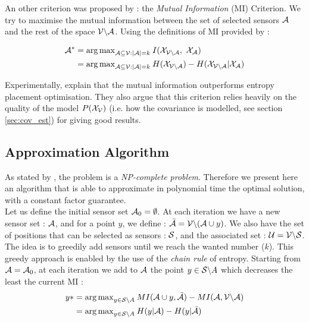 An other criterion was proposed by \citet{caselton_optimal_1984} : the \textit{Mutual Information} (MI) Criterion. We try to maximise the mutual information between the set of selected sensors $\A$ and the rest of the space $\VA$. Using the definitions of MI provided by \citet[p.~19]{cover_elements_1991} : 

\begin{align}
    \A^* &= {\arg\max}_{\A \subseteq \V : |\A| = k } \: I(\X_{\VA} , \X_\A) \\
    &= {\arg\max}_{\A \subseteq \V : |\A| = k } \: H(\X_{\VA}) -  H(\X_{\VA} | \X_{\A})
\end{align}


Experimentally, \citet{krause_near-optimal_2008} explain that  the mutual information outperforms entropy placement optimisation. They also argue that this criterion relies heavily on the quality of the model $P(\X_\V)$ (i.e. how the covariance is modelled, see section \ref{sec:cov_est}) for giving good results. 

\subsection{Approximation Algorithm}
 
 As stated by \citet{krause_near-optimal_2008}, the problem is a \textit{NP-complete problem}. Therefore we present here an algorithm that is able to approximate in polynomial time the optimal solution, with a constant factor guarantee. \\
 
 Let us define the initial sensor set $\A_0 = \emptyset$. At each iteration we have a new sensor set : $\A$,  and for a point $y$, we define : $\bar{\A} = \V \backslash ( \A \cup y )$. We also have the set of positions that can be selected as sensors : $\S$,  and the associated set : $\U = \V \backslash \S $. \\
 
 
 The idea is to greedily add sensors until we reach the wanted number ($k$).   This greedy approach is enabled by the use of the \textit{chain rule} of entropy.  Starting from $\A = \A_0$, at each iteration we add to $\A$ the point $y \in \S \backslash A $ which decreases the least the current MI : 
\begin{align}
    y* &= {\arg \max}_{y \in \S \backslash A } \: MI(\A \cup y, \bar{\A} ) - MI(\A, \VA) \\
    &= {\arg \max}_{y \in \S \backslash A } \: H(y | \A ) - H(y | \bar{\A} )
\end{align}

